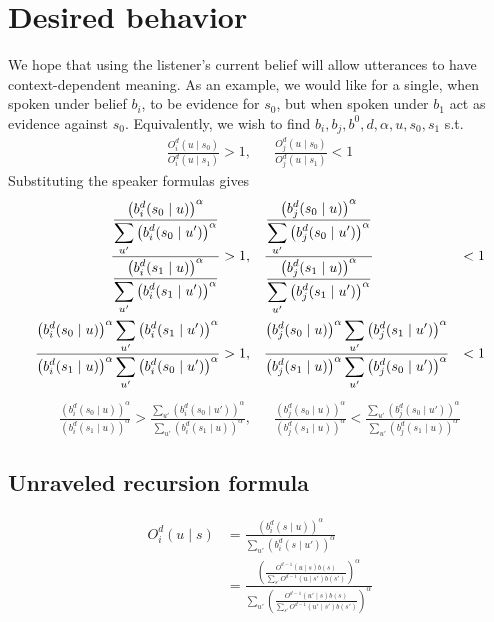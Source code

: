 \documentclass[12pt,fleqn,leqno,letterpaper]{article}
\newcommand\al[1]{\left({#1}\right)^{\alpha}}
\newcommand\listener[4]{\ddfrac{O^{{#3}-1}({#2} \mid {#1})b({#1})}{\sum_{s'}O^{{#3}-1}({#2} \mid s')b(s')}}
\newcommand\lstn[4]{b_{#4}^{#3}({#1}\mid {#2})}
\newcommand\lstna[4]{\left(\lstn{#1}{#2}{#3}{#4}\right)^{\alpha}}
\newcommand\spkr[4]{O_{#4}^{#3}({#2} \mid {#1})}
\newcommand\speaker[4]{\ddfrac{\left(b_{#4}^{#3}({#1} \mid {#2})\right)^{\alpha}}{\sum_{u'}\left(b_{#4}^{#3}({#1} \mid u')\right)^{\alpha}}}
\newcommand\speakerrat[5]{\ddfrac{\left(\lstn{#1}{#3}{#4}{#5}\right)^{\alpha}\sum_{u'}\left(\lstn{#2}{u'}{#4}{#5}\right)^{\alpha}}{\left(\lstn{#2}{#3}{#4}{#5} \right)^{\alpha}\sum_{u'}\left(\lstn{#1}{u'}{#4}{#5}\right)^{\alpha}}}
\def\ddfrac#1#2{\displaystyle\frac{\displaystyle #1}{\displaystyle #2}}
\begin{document}
\section{Desired behavior}
We hope that using the listener's current belief will allow utterances to have context-dependent meaning. As an example, we would like for a single, when spoken under belief $b_i$, to be evidence for $s_0$, but when spoken under $b_1$ act as evidence against $s_0$. 
Equivalently, we wish to find $b_i, b_j, b^0, d, \alpha, u, s_0, s_1$ s.t.
\begin{align}
    \ddfrac{O_i^d(u \mid s_0)}{O_i^d(u \mid s_1)} > 1, && \ddfrac{O_j^d(u \mid s_0)}{O_j^d(u \mid s_1)} < 1
\end{align}
Substituting the speaker formulas gives
\begin{align}
	\ddfrac{\speaker{s_0}{u}{d}{i}}{\speaker{s_1}{u}{d}{i}} &> 1, && \ddfrac{\speaker{s_0}{u}{d}{j}}{\speaker{s_1}{u}{d}{j}} &< 1\\
	\speakerrat{s_0}{s_1}{u}{d}{i} &> 1, && \speakerrat{s_0}{s_1}{u}{d}{j} &< 1
\end{align}
\begin{align}
	\ddfrac{\lstna{s_0}{u}{d}{i}}{\lstna{s_1}{u}{d}{i}} > \ddfrac{\sum_{u'}\lstna{s_0}{u'}{d}{i}}{\sum_{u'}\lstna{s_1}{u}{d}{i}}, && \ddfrac{\lstna{s_0}{u}{d}{j}}{\lstna{s_1}{u}{d}{j}} < \ddfrac{\sum_{u'}\lstna{s_0}{u'}{d}{j}}{\sum_{u'}\lstna{s_1}{u}{d}{j}}
\end{align}

\subsection{Unraveled recursion formula}
\begin{align}
\spkr{s}{u}{d}{i} &= \speaker{s}{u}{d}{i}\\
&= \ddfrac{\al{\listener{s}{u}{d}{i}}}{\sum_{u'}\al{\listener{s}{u'}{d}{i}}}
\end{align}

\end{document}
